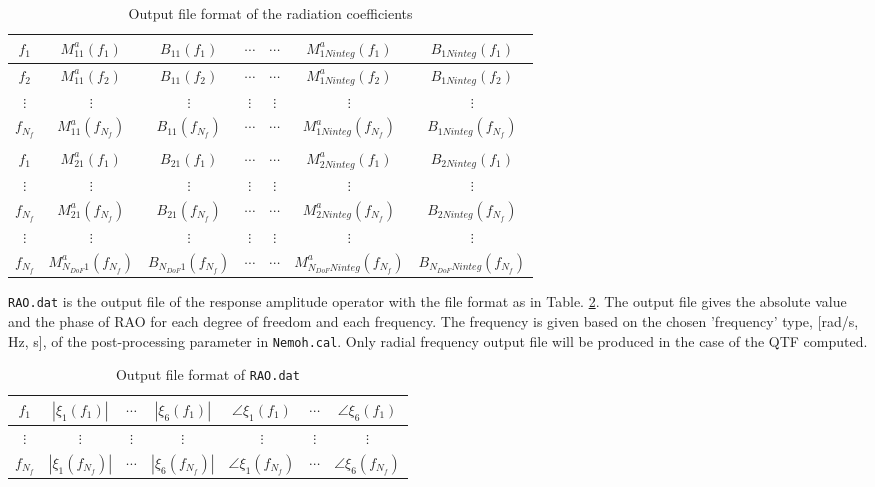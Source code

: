 \documentclass[12pt,a4paper,titlepage]{article}
\begin{document}
\begin{table}[ht]
\begin{center}
\caption{Output file format of the radiation coefficients}\label{tab:addedmass_damping_coeffs}
\begin{tabular}{ccccccc}
\hline
$f_1$ & $M^a_{11}(f_1)$ & $B_{11}(f_1)$ &$\cdots$ &$\cdots$&$ M^a_{1Ninteg}(f_1)$ & $B_{1Ninteg}(f_1)$ \\
\hline
$f_2$ & $M^a_{11}(f_2)$ & $B_{11}(f_2)$ &$\cdots$ &$\cdots$&$ M^a_{1Ninteg}(f_2)$ & $B_{1Ninteg}(f_2)$ \\
\hline
$\vdots$ & $\vdots$ & $\vdots$ & $\vdots$ & $\vdots$ & $\vdots$ & $\vdots$ \\
\hline
$f_{N_f}$ & $M^a_{11}(f_{N_f})$ & $B_{11}(f_{N_f})$ &$\cdots$ &$\cdots$&$ M^a_{1Ninteg}(f_{N_f})$ & $B_{1Ninteg}(f_{N_f})$ \\
\hline
& &  & & & & \\
\hline
$f_1$ & $M^a_{21}(f_1)$ & $B_{21}(f_1)$ &$\cdots$ &$\cdots$&$ M^a_{2Ninteg}(f_1)$ & $B_{2Ninteg}(f_1)$ \\
\hline
$\vdots$ & $\vdots$ & $\vdots$ & $\vdots$ & $\vdots$ & $\vdots$ & $\vdots$ \\
\hline
$f_{N_f}$ & $M^a_{21}(f_{N_f})$ & $B_{21}(f_{N_f})$ &$\cdots$ &$\cdots$&$ M^a_{2Ninteg}(f_{N_f})$ & $B_{2Ninteg}(f_{N_f})$ \\
\hline
$\vdots$ & $\vdots$ & $\vdots$ & $\vdots$ & $\vdots$ & $\vdots$ & $\vdots$ \\
\hline
$f_{N_f}$ & $M^a_{N_{DoF}1}(f_{N_f})$ & $B_{N_{DoF}1}(f_{N_f})$ &$\cdots$ &$\cdots$&$ M^a_{N_{DoF}Ninteg}(f_{N_f})$ & $B_{N_{DoF}Ninteg}(f_{N_f})$ \\
\hline
\end{tabular}
\end{center}
\end{table}

\noindent
\texttt{RAO.dat} is the output file of the response amplitude operator with the file format as in Table. \ref{tab:RAO}. The output file gives the absolute value and the phase of RAO for each degree of freedom and each frequency. The frequency is given based on the chosen 'frequency' type, [rad/s, Hz, s], of the post-processing parameter in \texttt{Nemoh.cal}. Only radial frequency output file will be produced in the case of the QTF computed.\\

\begin{table}[ht]
\begin{center}
\caption{Output file format of \texttt{RAO.dat}}\label{tab:RAO}
\begin{tabular}{ccccccc}
\hline
$f_1$ & $|\xi_1(f_1)|$ &$\cdots$ &$|\xi_6(f_1)|$ & $\angle \xi_1(f_1)$ &$\cdots$ &$\angle \xi_6(f_1)$ \\
\hline
$\vdots$& $\vdots$ & $\vdots$ & $\vdots$ &$\vdots$ &$\vdots$  &$\vdots$\\
\hline
$f_{N_f}$ & $|\xi_1(f_{N_f})|$ &$\cdots$ &$|\xi_6(f_{N_f})|$ & $\angle \xi_1(f_{N_f})$ &$\cdots$ &$\angle \xi_6(f_{N_f})$ \\
\hline
\end{tabular}
\end{center}
\end{table}
\end{document}
